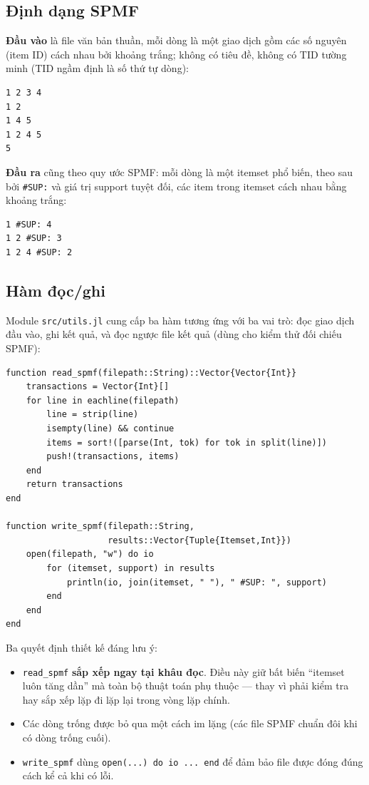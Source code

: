 \subsection{Định dạng SPMF}

\textbf{Đầu vào} là file văn bản thuần, mỗi dòng là một giao dịch gồm các số nguyên (item ID) cách nhau bởi khoảng trắng; không có tiêu đề, không có TID tường minh (TID ngầm định là số thứ tự dòng):

\begin{verbatim}
1 2 3 4
1 2
1 4 5
1 2 4 5
5
\end{verbatim}

\textbf{Đầu ra} cũng theo quy ước SPMF: mỗi dòng là một itemset phổ biến, theo sau bởi \texttt{\#SUP:} và giá trị support tuyệt đối, các item trong itemset cách nhau bằng khoảng trắng:

\begin{verbatim}
1 #SUP: 4
1 2 #SUP: 3
1 2 4 #SUP: 2
\end{verbatim}

\subsection{Hàm đọc/ghi}

Module \texttt{src/utils.jl} cung cấp ba hàm tương ứng với ba vai trò: đọc giao dịch đầu vào, ghi kết quả, và đọc ngược file kết quả (dùng cho kiểm thử đối chiếu SPMF):

\begin{verbatim}
function read_spmf(filepath::String)::Vector{Vector{Int}}
    transactions = Vector{Int}[]
    for line in eachline(filepath)
        line = strip(line)
        isempty(line) && continue
        items = sort!([parse(Int, tok) for tok in split(line)])
        push!(transactions, items)
    end
    return transactions
end

function write_spmf(filepath::String,
                    results::Vector{Tuple{Itemset,Int}})
    open(filepath, "w") do io
        for (itemset, support) in results
            println(io, join(itemset, " "), " #SUP: ", support)
        end
    end
end
\end{verbatim}

Ba quyết định thiết kế đáng lưu ý:
\begin{itemize}
    \item \texttt{read\_spmf} \textbf{sắp xếp ngay tại khâu đọc}. Điều này giữ bất biến ``itemset luôn tăng dần'' mà toàn bộ thuật toán phụ thuộc --- thay vì phải kiểm tra hay sắp xếp lặp đi lặp lại trong vòng lặp chính.
    \item Các dòng trống được bỏ qua một cách im lặng (các file SPMF chuẩn đôi khi có dòng trống cuối).
    \item \texttt{write\_spmf} dùng \texttt{open(...) do io ... end} để đảm bảo file được đóng đúng cách kể cả khi có lỗi.
\end{itemize}

